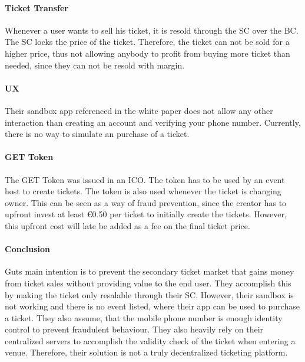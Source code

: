 \paragraph{Ticket Transfer}
Whenever a user wants to sell his ticket, it is resold through the SC over the BC. The SC locks the price of the ticket. Therefore, the ticket can not be sold for a higher price, thus not allowing anybody to profit from buying more ticket than needed, since they can not be resold with margin.


\paragraph{UX}
Their sandbox app referenced in the white paper does not allow any other interaction than creating an account and verifying your phone number. Currently, there is no way to simulate an purchase of a ticket.


\paragraph{GET Token}
The GET Token was issued in an ICO. The token has to be used by an event host to create tickets. The token is also used whenever the ticket is changing owner. This can be seen as a way of fraud prevention, since the creator has to upfront invest at least \euro0.50 per ticket to initially create the tickets. However, this upfront cost will late be added as a fee on the final ticket price.


\paragraph{Conclusion}
Guts main intention is to prevent the secondary ticket market that gains money from ticket sales without providing value to the end user. They accomplish this by making the ticket only resalable through their SC. However, their sandbox is not working and there is no event listed, where their app can be used to purchase a ticket. They also assume, that the mobile phone number is enough identity control to prevent fraudulent behaviour. They also heavily rely on their centralized servers to accomplish the validity check of the ticket when entering a venue. Therefore, their solution is not a truly decentralized ticketing platform.
